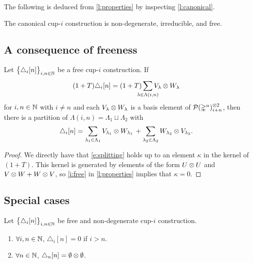The following is deduced from \cref{l:properties} by inspecting \cref{l:canonical}.

\begin{theorem} \label{t:existence}
	The canonical \mbox{cup-$i$} construction is non-degenerate, irreducible, and free.
\end{theorem}

\subsection{A consequence of freeness} \label{ss:consequence}

\begin{lemma} \label{l:consequence}
	Let $\big\{ \triangle_i [n] \big\}_{i,n\in\mathbb{N}}$ be a free \mbox{cup-$i$} construction.
	If
	\[
	(1+T) \triangle_i [n] =
	(1+T) \sum_{\mathclap{\lambda \in \Lambda(i,n)}} V_\lambda \ot W_\lambda
	\]
	for $i,n \in \mathbb{N}$ with $i \neq n$ and each $V_\lambda \otimes W_\lambda$ is a basis element of $\mathcal{P}(\mathbb{\Delta}^n)^{\otimes 2}_{i+n}$, then there is a partition of $\Lambda(i,n) = \Lambda_1 \sqcup \Lambda_2$ with
	\begin{equation} \label{e:splitting}
	\triangle_i [n] =
	\sum_{\lambda_1 \in \Lambda_1} V_{\lambda_1} \otimes W_{\lambda_1} \, +
	\sum_{\lambda_2 \in \Lambda_2} W_{\lambda_2} \otimes V_{\lambda_2}.
	\end{equation}
\end{lemma}

\begin{proof}
	We directly have that \eqref{e:splitting} holds up to an element $\kappa$ in the kernel of $(1+T)$.
	This kernel is generated by elements of the form $U \otimes U$ and $V \otimes W + W \otimes V$, so \cref{i:free} in \cref{l:properties} implies that $\kappa = 0$.
\end{proof}

\subsection{Special cases} \label{ss:cases}

\begin{lemma} \label{l:special case one}
	Let $\big\{ \triangle_i [n] \big\}_{i,n\in\mathbb{N}}$ be free and non-degenerate \mbox{cup-$i$} construction.
	\begin{enumerate}
		\item \label{i:i>n} $\forall i,n \in \mathbb{N}$, $\triangle_i[n] = 0$ if $i > n$.
		\item \label{i:i=n} $\forall n \in \mathbb{N}$, $\triangle_n[n] = \emptyset \otimes \emptyset$.
	\end{enumerate}
\end{lemma}

